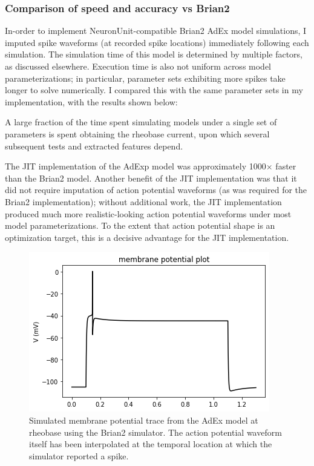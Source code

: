 \subsubsection{Comparison of speed and accuracy vs Brian2}
In-order to implement NeuronUnit-compatible Brian2 AdEx model simulations, I imputed spike waveforms (at recorded spike locations) immediately following each simulation.
The simulation time of this model is determined by multiple factors, as discussed elsewhere. Execution time is also not uniform across model parameterizations; in particular, parameter sets exhibiting more spikes take longer to solve numerically.
I compared this with the same parameter sets in my implementation, with the results shown below:

A large fraction of the time spent simulating models under a single set of parameters is spent obtaining the rheobase current, upon which several subsequent tests and extracted features depend.

The JIT implementation of the AdExp model was approximately 1000$\times$ faster than the Brian2 model.
Another benefit of the JIT implementation was that it did not require imputation of action potential waveforms (as was required for the Brian2 implementation); without additional work, the JIT implementation produced much more realistic-looking action potential waveforms under most model parameterizations.
To the extent that action potential shape is an optimization target, this is a decisive advantage for the JIT implementation.

\begin{figure}
\begin{center}
\includegraphics[scale=0.7]{figures/backend_check_files/backend_check_12_10}
\caption[Brian2 simulation of the AdEx model]{Simulated membrane potential trace from the AdEx model at rheobase using the Brian2 simulator.  The action potential waveform itself has been interpolated at the temporal location at which the simulator reported a spike.}
\label{fig:AdEx-Brian2-sim}
\end{center}
\end{figure}

